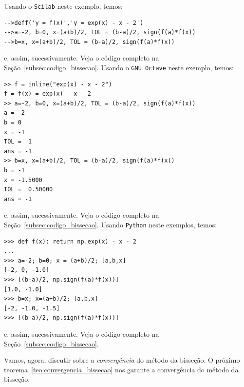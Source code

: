\begin{sol}
\ifisscilab
Usando o \verb+Scilab+ neste exemplo, temos:
\begin{verbatim}
-->deff('y = f(x)','y = exp(x) - x - 2')
-->a=-2, b=0, x=(a+b)/2, TOL = (b-a)/2, sign(f(a)*f(x))
-->b=x, x=(a+b)/2, TOL = (b-a)/2, sign(f(a)*f(x))
\end{verbatim}
  e, assim, sucessivamente. Veja o código completo na Seção~\ref{subsec:codigo_bissecao}.
\fi    
\ifisoctave
Usando o \verb+GNU Octave+ neste exemplo, temos:
\begin{verbatim}
>> f = inline("exp(x) - x - 2")
f = f(x) = exp(x) - x - 2
>> a=-2, b=0, x=(a+b)/2, TOL = (b-a)/2, sign(f(a)*f(x))
a = -2
b = 0
x = -1
TOL =  1
ans = -1
>> b=x, x=(a+b)/2, TOL = (b-a)/2, sign(f(a)*f(x))
b = -1
x = -1.5000
TOL =  0.50000
ans = -1
\end{verbatim}
e, assim, sucessivamente. Veja o código completo na Seção~\ref{subsec:codigo_bissecao}.
\fi    
\ifispython
Usando \verb+Python+ neste exemplos, temos:
\begin{verbatim}
>>> def f(x): return np.exp(x) - x - 2
... 
>>> a=-2; b=0; x = (a+b)/2; [a,b,x]
[-2, 0, -1.0]
>>> [(b-a)/2, np.sign(f(a)*f(x))]
[1.0, -1.0]
>>> b=x; x=(a+b)/2; [a,b,x]
[-2, -1.0, -1.5]
>>> [(b-a)/2, np.sign(f(a)*f(x))]
\end{verbatim}
e, assim, sucessivamente. Veja o código completo na Seção~\ref{subsec:codigo_bissecao}.
\fi    
\end{sol}

Vamos, agora, discutir sobre a \emph{convergência} do método da bisseção. O próximo teorema~\ref{teo:convergencia_bissecao} nos garante a convergência do método da bisseção.

